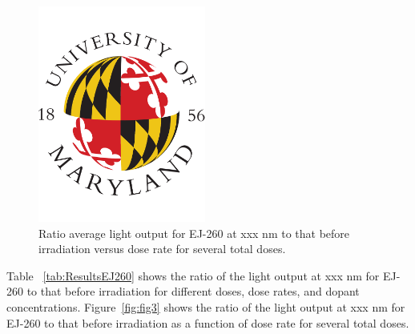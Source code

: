 \documentclass[review]{elsarticle}
\begin{document}
\begin{figure}[!ht]
\begin{center}
\includegraphics[width=0.49\textwidth]{./figures/placeholder.pdf}
\caption{
Ratio average light output for EJ-260 at {\color{red} xxx nm} to that before irradiation versus dose rate for several total doses.
}
\label{fig:fig2}
\end{center}
\end{figure}

Table ~\ref{tab:ResultsEJ260} shows the ratio of the light output at {\color{red} xxx nm}
for EJ-260 to that before irradiation for different doses, dose rates, and
dopant concentrations.
Figure~\ref{fig:fig3} shows the ratio of the light output at {\color{red} xxx nm}
for EJ-260 to that before irradiation as a function of dose rate
for several total doses.
\end{document}
